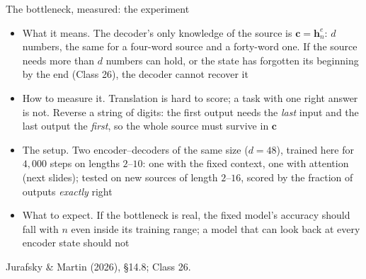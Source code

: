 \documentclass[aspectratio=169, 11pt]{beamer}
\newcommand{\srcline}[1]{%
  \par\vspace{0.25em}%
  {\scriptsize\color{mcMuted}\hfill #1\par}}
\newcommand{\src}[3]{}      %
\begin{document}
\begin{frame}{The bottleneck, measured: the experiment}
  \src{jurafsky_slp3}{section}{14.8}
  \vspace{-0.3em}
  {\footnotesize
  \begin{itemize}\itemsep0.26em
    \item \alert{What it means.} The decoder's only knowledge of the source
          is $\mathbf{c} = \mathbf{h}^e_n$: $d$ numbers, the same for a
          four-word source and a forty-word one. If the source needs more
          than $d$ numbers can hold, or the state has forgotten its
          beginning by the end (Class 26), the decoder cannot recover it
    \item \alert{How to measure it.} Translation is hard to score; a task
          with one right answer is not. \alert{Reverse a string of digits}:
          the first output needs the \emph{last} input and the last output
          the \emph{first}, so the whole source must survive in $\mathbf{c}$
    \item \alert{The setup.} Two encoder--decoders of the same size
          ($d = 48$), trained here for $4{,}000$ steps on lengths $2$--$10$:
          one with the fixed context, one with attention (next slides);
          tested on new sources of length $2$--$16$, scored by the fraction
          of outputs \emph{exactly} right
    \item \alert{What to expect.} If the bottleneck is real, the fixed
          model's accuracy should fall with $n$ even inside its training
          range; a model that can look back at every encoder state should not
  \end{itemize}}
  \srcline{Jurafsky \& Martin (2026), \S14.8; Class 26.}
\end{frame}
\end{document}
